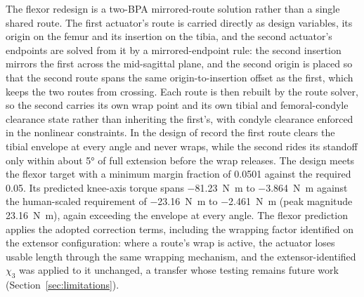 \documentclass[utf8]{FrontiersinHarvard} %
\begin{document}
The flexor redesign is a two-BPA mirrored-route solution rather than a single shared route. The first actuator's route is carried directly as design variables, its origin on the femur and its insertion on the tibia, and the second actuator's endpoints are solved from it by a mirrored-endpoint rule: the second insertion mirrors the first across the mid-sagittal plane, and the second origin is placed so that the second route spans the same origin-to-insertion offset as the first, which keeps the two routes from crossing. Each route is then rebuilt by the route solver, so the second carries its own wrap point and its own tibial and femoral-condyle clearance state rather than inheriting the first's, with condyle clearance enforced in the nonlinear constraints. In the design of record the first route clears the tibial envelope at every angle and never wraps, while the second rides its standoff only within about \ang{5} of full extension before the wrap releases. The design meets the flexor target with a minimum margin fraction of 0.0501 against the required 0.05. Its predicted knee-axis torque spans \qty{-81.23}{\newton\meter} to \qty{-3.864}{\newton\meter} against the human-scaled requirement of \qty{-23.16}{\newton\meter} to \qty{-2.461}{\newton\meter} (peak magnitude \qty{23.16}{\newton\meter}), again exceeding the envelope at every angle. The flexor prediction applies the adopted correction terms, including the wrapping factor identified on the extensor configuration: where a route's wrap is active, the actuator loses usable length through the same wrapping mechanism, and the extensor-identified $\chi_{3}$ was applied to it unchanged, a transfer whose testing remains future work (Section~\ref{sec:limitations}).
\end{document}

